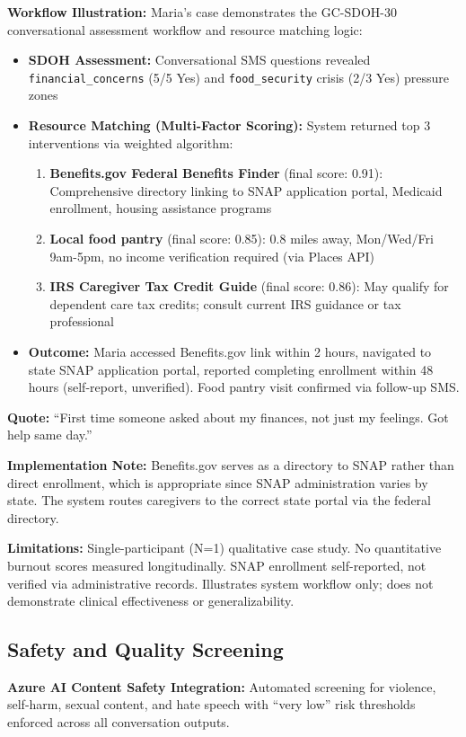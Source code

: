 \documentclass{article}
\begin{document}
\textbf{Workflow Illustration:} Maria's case demonstrates the GC-SDOH-30 conversational assessment workflow and resource matching logic:
\begin{itemize}
    \item \textbf{SDOH Assessment:} Conversational SMS questions revealed \texttt{financial\_concerns} (5/5 Yes) and \texttt{food\_security} crisis (2/3 Yes) pressure zones
    \item \textbf{Resource Matching (Multi-Factor Scoring):} System returned top 3 interventions via weighted algorithm:
    \begin{enumerate}
        \item \textbf{Benefits.gov Federal Benefits Finder} (final score: 0.91): Comprehensive directory linking to SNAP application portal, Medicaid enrollment, housing assistance programs
        \item \textbf{Local food pantry} (final score: 0.85): 0.8 miles away, Mon/Wed/Fri 9am-5pm, no income verification required (via Places API)
        \item \textbf{IRS Caregiver Tax Credit Guide} (final score: 0.86): May qualify for dependent care tax credits; consult current IRS guidance or tax professional
    \end{enumerate}
    \item \textbf{Outcome:} Maria accessed Benefits.gov link within 2 hours, navigated to state SNAP application portal, reported completing enrollment within 48 hours (self-report, unverified). Food pantry visit confirmed via follow-up SMS.
\end{itemize}

\textbf{Quote:} ``First time someone asked about my finances, not just my feelings. Got help same day.''

\textbf{Implementation Note:} Benefits.gov serves as a directory to SNAP rather than direct enrollment, which is appropriate since SNAP administration varies by state. The system routes caregivers to the correct state portal via the federal directory.

\textbf{Limitations:} Single-participant (N=1) qualitative case study. No quantitative burnout scores measured longitudinally. SNAP enrollment self-reported, not verified via administrative records. Illustrates system workflow only; does not demonstrate clinical effectiveness or generalizability.

\subsection{Safety and Quality Screening}%
\label{subsec:SafetyandQualityScreening}%
\textbf{Azure AI Content Safety Integration:} Automated screening for violence, self-harm, sexual content, and hate speech with ``very low'' risk thresholds enforced across all conversation outputs.
\end{document}
